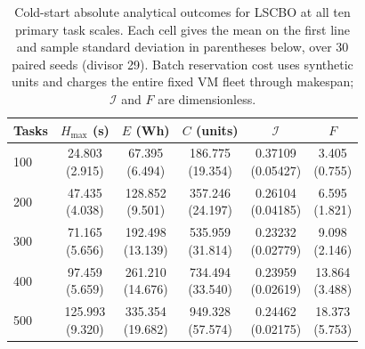 \begin{table}[!htbp]
\centering\small
\setlength{\tabcolsep}{4pt}
\caption{Cold-start absolute analytical outcomes for LSCBO at all ten primary task scales. Each cell gives the mean on the first line and sample standard deviation in parentheses below, over 30 paired seeds (divisor 29). Batch reservation cost uses synthetic units and charges the entire fixed VM fleet through makespan; $\mathcal{I}$ and $F$ are dimensionless.}\label{tab:main_scale_dispersion}
\begin{tabular}{l c c c c c}
\toprule
Tasks & $H_{\max}$ (s) & $E$ (Wh) & $C$ (units) & $\mathcal{I}$ & $F$ \\
\midrule
100 & \shortstack{24.803\\(2.915)} & \shortstack{67.395\\(6.494)} & \shortstack{186.775\\(19.354)} & \shortstack{0.37109\\(0.05427)} & \shortstack{3.405\\(0.755)} \\
200 & \shortstack{47.435\\(4.038)} & \shortstack{128.852\\(9.501)} & \shortstack{357.246\\(24.197)} & \shortstack{0.26104\\(0.04185)} & \shortstack{6.595\\(1.821)} \\
300 & \shortstack{71.165\\(5.656)} & \shortstack{192.498\\(13.139)} & \shortstack{535.959\\(31.814)} & \shortstack{0.23232\\(0.02779)} & \shortstack{9.098\\(2.146)} \\
400 & \shortstack{97.459\\(5.659)} & \shortstack{261.210\\(14.676)} & \shortstack{734.494\\(33.540)} & \shortstack{0.23959\\(0.02619)} & \shortstack{13.864\\(3.488)} \\
500 & \shortstack{125.993\\(9.320)} & \shortstack{335.354\\(19.682)} & \shortstack{949.328\\(57.574)} & \shortstack{0.24462\\(0.02175)} & \shortstack{18.373\\(5.753)} \\

\end{tabular}
\end{table}
